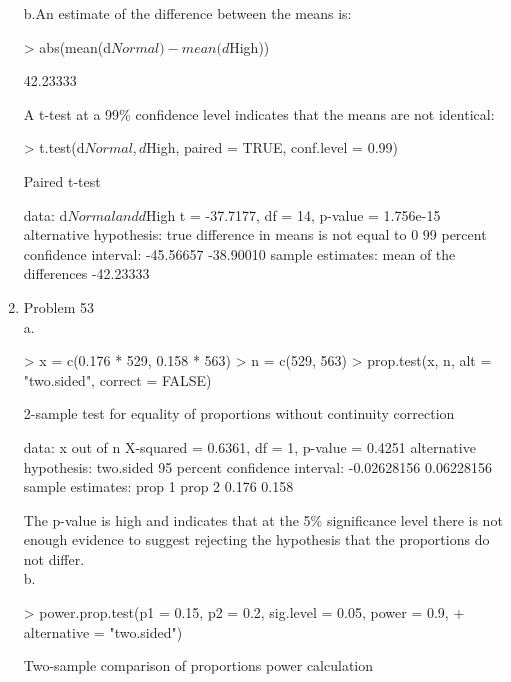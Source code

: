 \documentclass[11pt,letterpaper]{article}
\begin{document}
\begin{enumerate}
b.An estimate of the difference between the means is:
\begin{Schunk}
\begin{Sinput}
> abs(mean(d$Normal) - mean(d$High))
\end{Sinput}
\begin{Soutput}
[1] 42.23333
\end{Soutput}
\end{Schunk}

A t-test at a 99\% confidence level indicates that the means are not identical:
\begin{Schunk}
\begin{Sinput}
> t.test(d$Normal, d$High, paired = TRUE, conf.level = 0.99)
\end{Sinput}
\begin{Soutput}
	Paired t-test

data:  d$Normal and d$High 
t = -37.7177, df = 14, p-value = 1.756e-15
alternative hypothesis: true difference in means is not equal to 0 
99 percent confidence interval:
 -45.56657 -38.90010 
sample estimates:
mean of the differences 
              -42.23333 
\end{Soutput}
\end{Schunk}

\item Problem 53\\
a.
\begin{Schunk}
\begin{Sinput}
> x = c(0.176 * 529, 0.158 * 563)
> n = c(529, 563)
> prop.test(x, n, alt = "two.sided", correct = FALSE)
\end{Sinput}
\begin{Soutput}
	2-sample test for equality of proportions without continuity
	correction

data:  x out of n 
X-squared = 0.6361, df = 1, p-value = 0.4251
alternative hypothesis: two.sided 
95 percent confidence interval:
 -0.02628156  0.06228156 
sample estimates:
prop 1 prop 2 
 0.176  0.158 
\end{Soutput}
\end{Schunk}
The p-value is high and indicates that at the 5\% significance level there is not enough evidence to suggest rejecting the hypothesis that the proportions do not differ.\\
b.
\begin{Schunk}
\begin{Sinput}
> power.prop.test(p1 = 0.15, p2 = 0.2, sig.level = 0.05, power = 0.9, 
+     alternative = "two.sided")
\end{Sinput}
\begin{Soutput}
     Two-sample comparison of proportions power calculation 


\end{Soutput}
\end{Schunk}
\end{enumerate}
\end{document}
